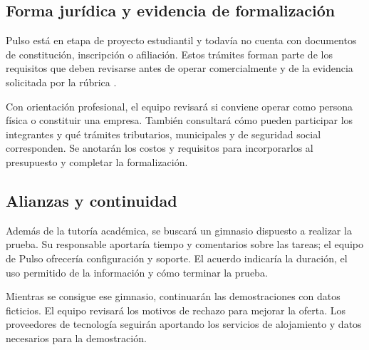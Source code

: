 \subsection{Forma jurídica y evidencia de formalización}

Pulso está en etapa de proyecto estudiantil y todavía no cuenta con documentos
de constitución, inscripción o afiliación. Estos trámites forman parte de los
requisitos que deben revisarse antes de operar comercialmente y de la evidencia
solicitada por la rúbrica \parencite{rubrica_plan_negocios_2026}.

Con orientación profesional, el equipo revisará si conviene operar como
persona física o constituir una empresa. También consultará cómo pueden
participar los integrantes y qué trámites tributarios, municipales y de
seguridad social corresponden. Se anotarán los costos y requisitos para
incorporarlos al presupuesto y completar la formalización.

\subsection{Alianzas y continuidad}

Además de la tutoría académica, se buscará un gimnasio dispuesto a realizar
la prueba. Su responsable aportaría tiempo y comentarios sobre las tareas;
el equipo de Pulso ofrecería configuración y soporte. El acuerdo indicaría la
duración, el uso permitido de la información y cómo terminar la prueba.

Mientras se consigue ese gimnasio, continuarán las demostraciones con datos
ficticios. El equipo revisará los motivos de rechazo para mejorar la oferta.
Los proveedores de tecnología seguirán aportando los servicios de alojamiento
y datos necesarios para la demostración.
